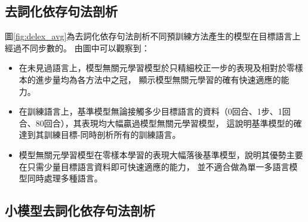 \subsection{去詞化依存句法剖析}



圖\ref{fig:delex_avg}為去詞化依存句法剖析不同預訓練方法產生的模型在目標語言上經過不同步數的。
由圖中可以觀察到：
\begin{itemize}
    \item 在未見過語言上，模型無關元學習模型於只精細校正一步的表現及相對於零樣本的進步量均為各方法中之冠，
顯示模型無關元學習的確有快速適應的能力。
    \item 在訓練語言上，基準模型無論接觸多少目標語言的資料（0回合、1步、1回合、80回合），其表現均大幅贏過模型無關元學習模型，
    這說明基準模型的確達到其訓練目標-同時剖析所有的訓練語言。
    \item 模型無關元學習模型在零樣本學習的表現大幅落後基準模型，說明其優勢主要在只需少量目標語言資料即可快速適應的能力，
    並不適合做為單一多語言模型同時處理多種語言。
\end{itemize}

\subsection{小模型去詞化依存句法剖析}
\label{subsec:result_small_delex_parsing}





\iffalse




\fi

